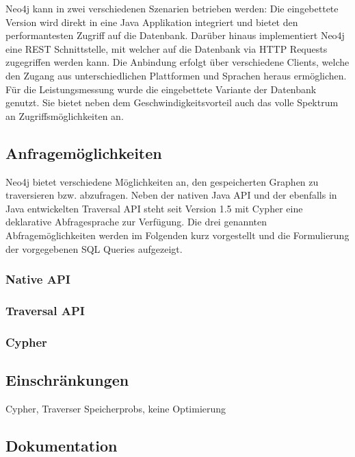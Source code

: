 \documentclass[11pt, a4paper, oneside, twocolumn]{article} %
\begin{document}
Neo4j kann in zwei verschiedenen Szenarien betrieben werden: Die eingebettete Version wird direkt in eine Java Applikation integriert und bietet den performantesten Zugriff auf die Datenbank. Darüber hinaus implementiert Neo4j eine REST Schnittstelle, mit welcher auf die Datenbank via HTTP Requests zugegriffen werden kann. Die Anbindung erfolgt über verschiedene Clients, welche den Zugang aus unterschiedlichen Plattformen und Sprachen heraus ermöglichen.\\
Für die Leistungsmessung wurde die eingebettete Variante der Datenbank genutzt. Sie bietet neben dem Geschwindigkeitsvorteil auch das volle Spektrum an Zugriffsmöglichkeiten an.

\subsection{Anfragemöglichkeiten}

Neo4j bietet verschiedene Möglichkeiten an, den gespeicherten Graphen zu traversieren bzw. abzufragen. Neben der nativen Java API und der ebenfalls in Java entwickelten Traversal API steht seit Version 1.5 mit Cypher eine deklarative Abfragesprache zur Verfügung. Die drei genannten Abfragemöglichkeiten werden im Folgenden kurz vorgestellt und die Formulierung der vorgegebenen SQL Queries aufgezeigt.

\subsubsection{Native API}

\subsubsection{Traversal API}

\subsubsection{Cypher}

\subsection{Einschränkungen}

Cypher, Traverser Speicherprobs, keine Optimierung

\subsection{Dokumentation}
\end{document}
